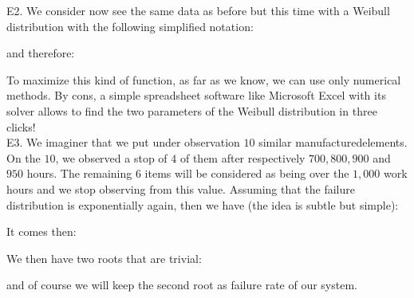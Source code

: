 	\pagebreak
	\begin{tcolorbox}[colframe=black,colback=white,sharp corners]
	E2. We consider now see the same data as before but this time with a Weibull distribution with the following simplified notation:
	
	and therefore:
	
	To maximize this kind of function, as far as we know, we can use only numerical methods. By cons, a simple spreadsheet software like Microsoft Excel with its solver allows to find the two parameters of the Weibull distribution in three clicks!\\
	
	E3. We imaginer that we put under observation $10$ similar manufacturedelements. On the $10$, we observed a stop of $4$ of them after respectively $700, 800, 900$ and $950$ hours. The remaining $6$ items will be considered as being over the $1,000$ work hours and we stop observing from this value. Assuming that the failure distribution is exponentially again, then we have (the idea is subtle but simple):
	
	It comes then:
	
	We then have two roots that are trivial:
	
	and of course we will keep the second root as failure rate of our system.
	\end{tcolorbox}

	\pagebreak
